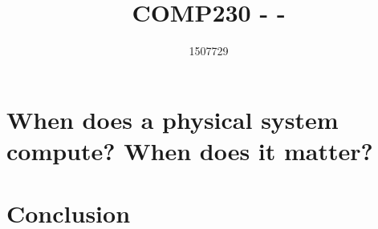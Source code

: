 \documentclass{scrartcl}
\title{COMP230 -  - }
\author{1507729}
\begin{document}
\maketitle

\section{When does a physical system compute? When does it matter?}

\section{Conclusion}





\end{document}
